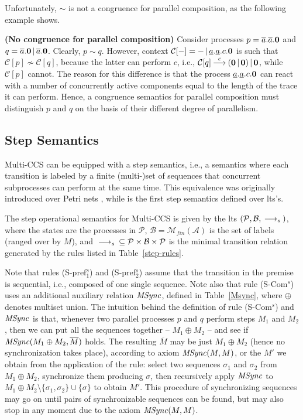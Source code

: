 Unfortunately, $\sim$ is not a congruence for parallel composition, as the following example shows.

\begin{example}\label{sim-no-cong}{\bf (No congruence for parallel composition)}
Consider processes $p = \overline{a}.\overline{a}.\mbox{\bf 0}$ and  $q = \overline{a}.\mbox{\bf 0} \mbox{$\,|\,$} \overline{a}.\mbox{\bf 0}$.
Clearly, $p \sim q$. However, context $\mathcal{C}[-] =  - \mbox{$\,|\,$} \underline{a}.\underline{a}.c.\mbox{\bf 0}$ is such
that $\mathcal{C}[p] \not\sim \mathcal{C}[q]$, because the latter can perform $c$, i.e., 
$\mathcal{C}[q] {\mbox{${\:\stackrel{c}{\longrightarrow}\:}$}} (\mbox{\bf 0} \mbox{$\,|\,$} \mbox{\bf 0}) \mbox{$\,|\,$} \mbox{\bf 0}$, 
while $\mathcal{C}[p]$ cannot. The reason for this
difference is that the process $\underline{a}.\underline{a}.c.\mbox{\bf 0}$ can react with a number of concurrently active components
equal to the length of the trace it can perform. Hence, a congruence semantics 
for parallel composition must distinguish $p$ and $q$ on the basis of their different degree of parallelism.
\fine
\end{example}

\subsection{Step Semantics}

Multi-CCS can be equipped with a step semantics, i.e., a semantics where each transition is labeled by a finite (multi-)set of 
sequences that concurrent subprocesses can perform at the same time. This equivalence was originally introduced 
over Petri nets \cite{NT84}, while \cite{Mil85} is the first step semantics
defined over lts's.

The  step operational semantics for Multi-CCS is given by the lts 
$({\mathcal P},{\mathcal B}, {\mbox{${\:\stackrel{ }{\longrightarrow_s}\:}$}})$, where the states are the processes
in ${\mathcal P}$, ${\mathcal B} = {\mathcal M}_{fin}({\mathcal A})$ 
is the set of labels (ranged over by $M$),
and ${\mbox{${\:\stackrel{ }{\longrightarrow_s}\:}$}} \subseteq {\mathcal P}\times{\mathcal B}\times{\mathcal P}$ is the minimal 
transition relation generated by the rules listed in Table~\ref{step-rules}. 

Note that rules (S-pref$_1^s$) and (S-pref$_2^s$) assume that the transition in the premise 
is sequential, i.e., composed of one single sequence. Note also that rule (S-Com$^s$)
uses an additional auxiliary relation $\mathit{MSync}$, defined in Table~\ref{Msync}, where $\oplus$ denotes multiset union.
The intuition behind the definition of rule (S-Com$^s$) and $\mathit{MSync}$ is that, whenever two parallel processes 
$p$ and $q$ perform steps $M_1$ and $M_2$, then we can put all the sequences together -- $M_1 \oplus M_2$ --
and see if $\mathit{MSync}(M_1 \oplus M_2, \overline{M})$ holds. The resulting $\overline{M}$ may be just 
$M_1 \oplus M_2$ (hence no synchronization takes place), according to axiom $\mathit{MSync}(M, M)$, 
or the $M'$ we obtain from the application of the rule:
select two sequences $\sigma_1$ and $\sigma_2$ from $M_1 \oplus M_2$, synchronize them producing $\sigma$,
then recursively apply $\mathit{MSync}$ to $M_1 \oplus M_2 \setminus \{\sigma_1, \sigma_2\} \cup \{\sigma\}$ to obtain $M'$.
This procedure of synchronizing sequences may go on until pairs of synchronizable sequences can be found, 
but may also stop in any moment due to the axiom $\mathit{MSync}(M, M)$.

